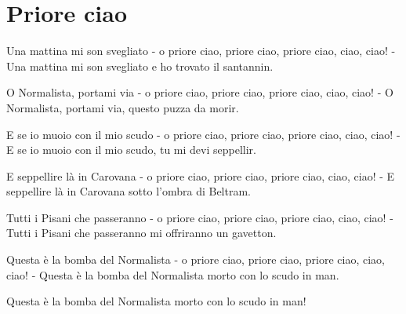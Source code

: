 \section{Priore ciao}
\begin{canzone}
Una mattina mi son svegliato
- o priore ciao, priore ciao, priore ciao, ciao, ciao! -
Una mattina mi son svegliato
e ho trovato il santannin.

O Normalista, portami via
- o priore ciao, priore ciao, priore ciao, ciao, ciao! -
O Normalista, portami via,
questo puzza da morir.

E se io muoio con il mio scudo
- o priore ciao, priore ciao, priore ciao, ciao, ciao! -
E se io muoio con il mio scudo,
tu mi devi seppellir.

E seppellire là in Carovana
- o priore ciao, priore ciao, priore ciao, ciao, ciao! -
E seppellire là in Carovana
sotto l'ombra di Beltram.

\clearpage
Tutti i Pisani che passeranno
- o priore ciao, priore ciao, priore ciao, ciao, ciao! -
Tutti i Pisani che passeranno
mi offriranno un gavetton.

Questa è la bomba del Normalista
- o priore ciao, priore ciao, priore ciao, ciao, ciao! -
Questa è la bomba del Normalista
morto con lo scudo in man.

Questa è la bomba del Normalista
morto con lo scudo in man!
\end{canzone}

